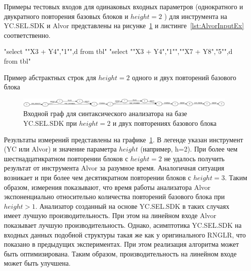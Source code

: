 Примеры тестовых входов для одинаковых входных параметров (однократного и двукратного повторения базовых блоков и $height=2$ ) для инструмента на YC.SEL.SDK и Alvor представлены на рисунке~\ref{fig:YCInput} и листинге~\ref{lst:AlvorInputEx}  соответственно. 

\begin{listing}
    \begin{pyglist}[numbers=left,numbersep=5pt]
"select "{"X3 + Y4","1"}",d from tbl"
"select "{"X3 + Y4","1"}","{"X7 + Y8","5"}",d from tbl"
\end{pyglist}
\caption{Пример абстрактных строк для $height=2$ одного и двух повторений базового блока}
\label{lst:AlvorInputEx}
\end{listing}

\begin{figure}[h!]
 \centering
 \includegraphics[width=0.98\textwidth]{pics/ycSQLinput.eps}
 \caption{Входной граф для синтаксического анализатора на базе YC.SEL.SDK при $height=2$ и двух повторениях базового блока}
 \label{fig:YCInput}
\end{figure}

Результаты измерений представлены на графике~\ref{fig:YCInput}. В легенде указан инструмент (YC или Alvor) и значение параметра $height$ (например, h=2). При более чем шестнадцатикратном повторении блоков с $height=2$ не удалось получить результат от инструмента Alvor за разумное время. Аналогичная ситуация возникает и при более чем десятикратном повторении блоков с $height=3$. Таким образом, измерения показывают, что время работы анализатора Alvor экспоненциально относительно количества повторений базового блока при $height>1$. Анализатор созданный на основе YC.SEL.SDK в таких случаях имеет лучшую производительность. При этом на линейном входе Alvor показывает лучшую производительность. Однако, асимптотика YC.SEL.SDK на входных данных подобной структуры такая же как у оригинального RNGLR, что показано в предыдущих экспериментах. При этом реализация алгоритма может быть оптимизирована. Таким образом, производительность на линейном входе может быть улучшена.

